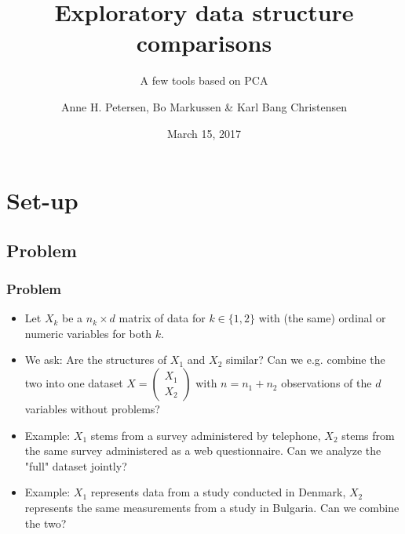 \documentclass[a4]{beamer}
\title{Exploratory data structure comparisons}
\subtitle{A few tools based on PCA}
\author{Anne H. Petersen, Bo Markussen \& Karl Bang Christensen}
\date{March 15, 2017}
\begin{document}
\maketitle

\section{Set-up}

\subsection{Problem}
\begin{frame}
\frametitle{Problem}
\begin{itemize}
\item Let $X_k$ be a $n_k \times d$ matrix of data for $k \in \{1, 2\}$ with (the same) ordinal or numeric variables for both $k$. 
\item We ask: Are the structures of $X_1$ and $X_2$ similar? Can we e.g. combine the two into one dataset $X = \begin{pmatrix} X_1 \\ X_2 \end{pmatrix}$ with $n = n_1 + n_2$ observations of the $d$ variables without problems?
\item Example: $X_1$ stems from a survey administered by telephone, $X_2$ stems from the same survey administered as a web questionnaire. Can we analyze the "full" dataset jointly?
\item Example: $X_1$ represents data from a study conducted in Denmark, $X_2$ represents the same measurements from a study in Bulgaria. Can we combine the two?
\end{itemize}
\end{frame}
\end{document}
